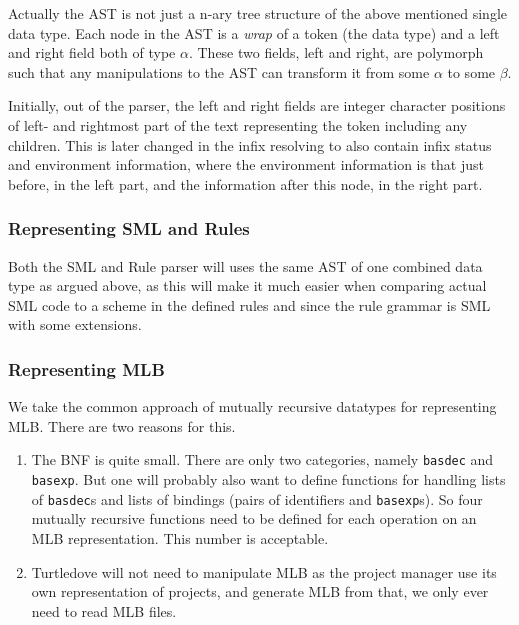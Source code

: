
Actually the AST is not just a n-ary tree structure of the above mentioned
single data type. Each node in the AST is a \textit{wrap} of a token (the data
type) and a left and right field both of type $\alpha$. These two fields, left
and right, are polymorph such that any manipulations to the AST can transform it
from some $\alpha$ to some $\beta$.

Initially, out of the parser, the left and right fields are integer character
positions of left- and rightmost part of the text representing the token
including any children. This is later changed in the infix resolving to also
contain infix status and environment information, where the environment
information is that just before, in the left part, and the information after
this node, in the right part.


\subsubsection{Representing SML and Rules}


Both the SML and Rule parser will uses the same AST of one combined data type as
argued above, as this will make it much easier
when comparing actual SML code to a scheme in the defined rules and since the
rule grammar is SML with some extensions. 

\subsubsection{Representing MLB}

We take the common approach of mutually recursive datatypes for representing
MLB. There are two reasons for this.

\begin{enumerate}
\item The BNF is quite small. There are only two categories, namely
  \texttt{basdec} and \texttt{basexp}. But one will probably also want to define
  functions for handling lists of \texttt{basdec}s and lists of bindings (pairs
  of identifiers and \texttt{basexp}s). So four mutually recursive functions
  need to be defined for each operation on an MLB representation. This number is
  acceptable.
\item Turtledove will not need to manipulate MLB as the project manager use its
  own representation of projects, and generate MLB from that, we only ever need
  to read MLB files.
\end{enumerate}



